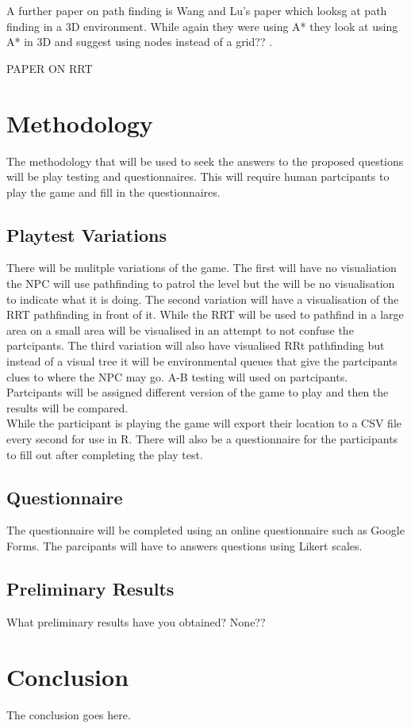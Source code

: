 \documentclass[journal]{IEEEtran}
\begin{document}
A further paper on path finding is Wang and Lu's paper which looksg at path finding in a 3D environment. While again they were using A* they look at using A* in 3D and suggest using nodes instead of a grid?? \cite{wang2012}.

PAPER ON RRT



\section{Methodology}
The methodology that will be used to seek the answers to the proposed questions will be play testing and questionnaires. This will require human partcipants to play the game and fill in the questionnaires. 

\subsection{Playtest Variations}
There will be mulitple variations of the game. The first will have no visualiation the NPC will use pathfinding to patrol the level but the will be no visualisation to indicate what it is doing.  The second variation will have a visualisation of the RRT pathfinding in front of it. While the RRT will be used to pathfind in a large area on a small area will be visualised in an attempt to not confuse the partcipants. The third variation will also have visualised RRt pathfinding but instead of a visual tree it will be environmental queues that give the partcipants clues to where the NPC may go. A-B testing will used on partcipants. Partcipants will be assigned different version of the game to play and then the results will be compared. \\
While the participant is playing the game will export their location to a CSV file every second for use in R. There will also be a questionnaire for the participants to fill out after completing the play test.

\subsection{Questionnaire}
The questionnaire will be completed using an online questionnaire such as Google Forms. The parcipants will have to answers questions using Likert scales.




\subsection{Preliminary Results}
What preliminary results have you obtained?
None??


\section{Conclusion}
The conclusion goes here.







\end{document}
